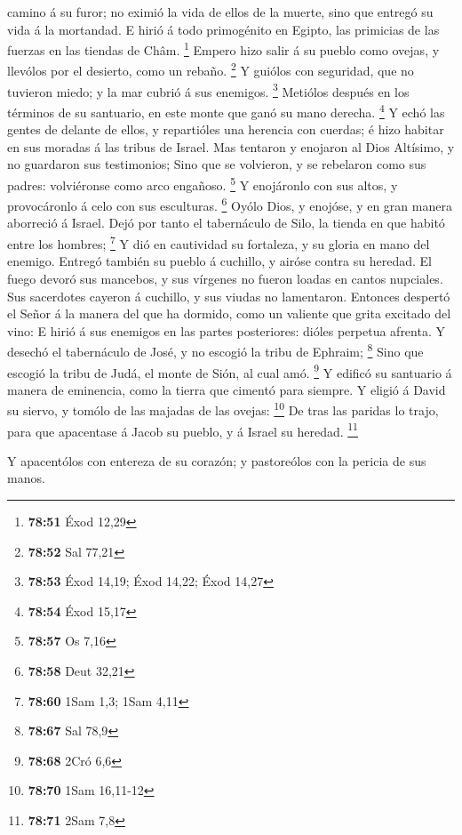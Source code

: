 camino á su furor; no eximió la vida de ellos de la muerte, sino que
entregó su vida á la mortandad.  E hirió á todo primogénito
en Egipto, las primicias de las fuerzas en las tiendas de Châm.
\footnote{\textbf{78:51} Éxod 12,29}  Empero hizo salir á
su pueblo como ovejas, y llevólos por el desierto, como un rebaño.
\footnote{\textbf{78:52} Sal 77,21}  Y guiólos con
seguridad, que no tuvieron miedo; y la mar cubrió á sus enemigos.
\footnote{\textbf{78:53} Éxod 14,19; Éxod 14,22; Éxod 14,27}
 Metiólos después en los términos de su santuario, en este
monte que ganó su mano derecha. \footnote{\textbf{78:54} Éxod 15,17}
 Y echó las gentes de delante de ellos, y repartióles una
herencia con cuerdas; é hizo habitar en sus moradas á las tribus de
Israel.  Mas tentaron y enojaron al Dios Altísimo, y no
guardaron sus testimonios;  Sino que se volvieron, y se
rebelaron como sus padres: volviéronse como arco engañoso. \footnote{\textbf{78:57}
  Os 7,16}  Y enojáronlo con sus altos, y provocáronlo á
celo con sus esculturas. \footnote{\textbf{78:58} Deut 32,21}
 Oyólo Dios, y enojóse, y en gran manera aborreció á
Israel.  Dejó por tanto el tabernáculo de Silo, la tienda
en que habitó entre los hombres; \footnote{\textbf{78:60} 1Sam 1,3; 1Sam
  4,11}  Y dió en cautividad su fortaleza, y su gloria en
mano del enemigo.  Entregó también su pueblo á cuchillo, y
airóse contra su heredad.  El fuego devoró sus mancebos, y
sus vírgenes no fueron loadas en cantos nupciales.  Sus
sacerdotes cayeron á cuchillo, y sus viudas no lamentaron. 
Entonces despertó el Señor á la manera del que ha dormido, como un
valiente que grita excitado del vino:  E hirió á sus
enemigos en las partes posteriores: dióles perpetua afrenta.
 Y desechó el tabernáculo de José, y no escogió la tribu de
Ephraim; \footnote{\textbf{78:67} Sal 78,9}  Sino que
escogió la tribu de Judá, el monte de Sión, al cual amó. \footnote{\textbf{78:68}
  2Cró 6,6}  Y edificó su santuario á manera de eminencia,
como la tierra que cimentó para siempre.  Y eligió á David
su siervo, y tomólo de las majadas de las ovejas: \footnote{\textbf{78:70}
  1Sam 16,11-12}  De tras las paridas lo trajo, para que
apacentase á Jacob su pueblo, y á Israel su heredad. \footnote{\textbf{78:71}
  2Sam 7,8}

 Y apacentólos con entereza de su corazón; y pastoreólos
con la pericia de sus manos.

